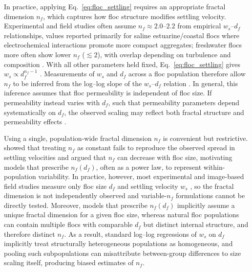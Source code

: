 \documentclass{agujournal2019}
\providecommand{\DIFadd}[1]{{\protect\color{blue}#1}}
\begin{document}
In practice, applying Eq.~\eqref{eq:floc_settling} requires an appropriate fractal dimension $n_f$, which captures how floc structure modifies settling velocity. \DIFadd{Experimental and field studies often assume $n_f \approx 2.0$–$2.2$ from empirical $w_s$–$d_f$ relationships, values reported primarily for saline estuarine/coastal flocs where electrochemical interactions promote more compact aggregates; freshwater flocs more often show lower $n_f$ ($\lesssim 2$), with overlap depending on turbulence and composition \cite{winterwerp1998simple,winterwerp2006heuristic}.} With all other parameters held fixed, Eq.~\eqref{eq:floc_settling} gives $w_s \propto d_f^{n_f-1}$ \cite{johnson1996settling, li1989fractal}. Measurements of $w_s$ and $d_f$ across a floc population therefore allow $n_f$ to be inferred from the log–log slope of the $w_s$–$d_f$ relation \cite{kranenburg1994fractal, strom2011explicit, winterwerp1998simple, winterwerp2002flocculation, winterwerp2004introduction, winterwerp2006heuristic}. In general, this inference assumes that floc permeability is independent of floc size. If permeability instead varies with $d_f$, such that permeability parameters depend systematically on $d_f$, the observed scaling may reflect both fractal structure and permeability effects \cite{strom2011explicit, nghiem2026flocculated}.


Using a single, population-wide fractal dimension $n_f$ is convenient but restrictive.  showed that treating $n_f$ as constant fails to reproduce the observed spread in settling velocities and argued that $n_f$ can decrease with floc size, motivating models that prescribe $n_f(d_f)$, often as a power law, to represent within-population variability. \DIFadd{In practice, however, most experimental and image-based field studies measure only floc size $d_f$ and settling velocity $w_s$ \cite{smith2015image, nghiem2024testing}, so the fractal dimension is not independently observed and variable-$n_f$ formulations cannot be directly tested. Moreover, models that prescribe $n_f(d_f)$ implicitly assume a unique fractal dimension for a given floc size, whereas natural floc populations can contain multiple flocs with comparable $d_f$ but distinct internal structure, and therefore distinct $n_f$.} As a result, standard log--log regressions of $w_s$ on $d_f$ implicitly treat structurally heterogeneous populations as homogeneous, and pooling such subpopulations can misattribute between-group differences to size scaling itself, producing biased estimates of $n_f$.
\end{document}
